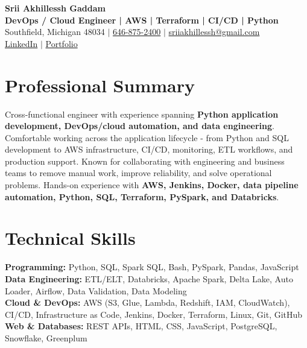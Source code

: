 \documentclass[letterpaper,10pt]{article}
\begin{document}
\fontsize{9.35pt}{10.45pt}\selectfont

\begin{center}
    {\LARGE \textbf{Srii Akhillessh Gaddam}} \\[-1pt]
    \textbf{DevOps / Cloud Engineer | AWS | Terraform | CI/CD | Python} \\[2pt]
    Southfield, Michigan 48034 $|$
    \href{tel:6468752400}{646-875-2400} $|$
    \href{mailto:sriiakhillessh@gmail.com}{sriiakhillessh@gmail.com} \\[1pt]
    \href{https://www.linkedin.com/in/srii-akhiilessh-gaddam-b48668191/}{LinkedIn} $|$
    \href{https://sriiakhillesshg.github.io/portfolio/}{Portfolio}
\end{center}
\vspace{-8pt}

\section{Professional Summary}
\small{Cross-functional engineer with experience spanning \textbf{Python application development, DevOps/cloud automation, and data engineering}. Comfortable working across the application lifecycle - from Python and SQL development to AWS infrastructure, CI/CD, monitoring, ETL workflows, and production support. Known for collaborating with engineering and business teams to remove manual work, improve reliability, and solve operational problems. Hands-on experience with \textbf{AWS, Jenkins, Docker, data pipeline automation, Python, SQL, Terraform, PySpark, and Databricks}.}

\section{Technical Skills}
\small{
\textbf{Programming:} Python, SQL, Spark SQL, Bash, PySpark, Pandas, JavaScript \\
\textbf{Data Engineering:} ETL/ELT, Databricks, Apache Spark, Delta Lake, Auto Loader, Airflow, Data Validation, Data Modeling \\
\textbf{Cloud \& DevOps:} AWS (S3, Glue, Lambda, Redshift, IAM, CloudWatch), CI/CD, Infrastructure as Code, Jenkins, Docker, Terraform, Linux, Git, GitHub \\
\textbf{Web \& Databases:} REST APIs, HTML, CSS, JavaScript, PostgreSQL, Snowflake, Greenplum
}
\end{document}
